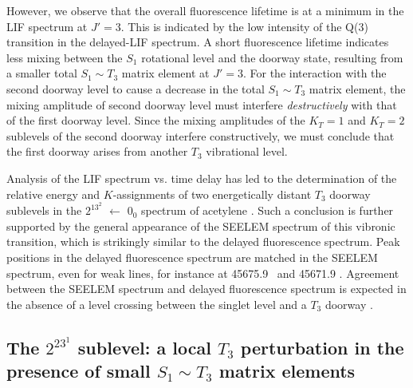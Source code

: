 However, we observe that the overall fluorescence lifetime is at a
minimum in the LIF spectrum at $J'=3$.  This is indicated by the low
intensity of the Q(3) transition in the delayed-LIF spectrum.  A short
fluorescence lifetime indicates less mixing between the $S_1$
rotational level and the doorway state, resulting from a smaller total
$S_1 \sim T_3$ matrix element at $J'=3$.  For the interaction with the
second doorway level to cause a decrease in the total $S_1 \sim T_3$
matrix element, the mixing amplitude of second doorway level must
interfere \emph{destructively} with that of the first doorway level.
Since the mixing amplitudes of the $K_T=1$ and $K_T=2$ sublevels of
the second doorway interfere constructively, we must conclude that the
first doorway arises from another $T_3$ vibrational level.

Analysis of the LIF spectrum vs. time delay has led to the
determination of the relative energy and $K$-assignments of two
energetically distant $T_3$ doorway sublevels in the $2^13^2$ 
$\leftarrow$ $0_0$ spectrum of acetylene \astate.  Such a conclusion
is further supported by the general appearance of the SEELEM spectrum
of this vibronic transition, which is strikingly similar to the
delayed fluorescence spectrum.  Peak positions in the delayed
fluorescence spectrum are matched in the SEELEM spectrum, even for
weak lines, for instance at 45675.9 \rcm\ and 45671.9 \rcm.  Agreement
between the SEELEM spectrum and delayed fluorescence spectrum is
expected in the absence of a level crossing between the singlet level
and a $T_3$ doorway \cite{altunata01}.


\subsection{The $2^23^1$  sublevel: a local $T_3$
  perturbation in the presence of small $S_1 \sim T_3$ matrix
  elements}



